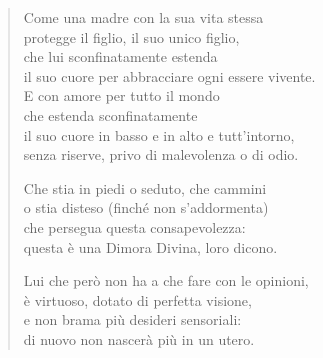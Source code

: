 \begin{quote}
Come una madre con la sua vita stessa \\
protegge il figlio, il suo unico figlio, \\
che lui sconfinatamente estenda \\
il suo cuore per abbracciare ogni essere vivente. \\
E con amore per tutto il mondo \\
che estenda sconfinatamente \\
il suo cuore in basso e in alto e tutt’intorno, \\
senza riserve, privo di malevolenza o di odio.


Che stia in piedi o seduto, che cammini \\
o stia disteso (finché non s’addormenta) \\
che persegua questa consapevolezza: \\
questa è una Dimora Divina, loro dicono.


Lui che però non ha a che fare con le opinioni, \\
è virtuoso, dotato di perfetta visione, \\
e non brama più desideri sensoriali: \\
di nuovo non nascerà più in un utero.
\end{quote}



